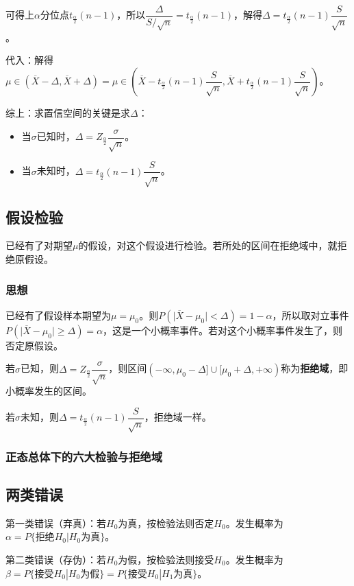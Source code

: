 \documentclass[UTF8, 12pt]{ctexart}
\begin{document}
可得上$\alpha$分位点$t_\frac{\alpha}{2}(n-1)$，所以$\dfrac{\Delta}{S/\sqrt{n}}=t_\frac{\alpha}{2}(n-1)$，解得$\Delta=t_\frac{\alpha}{2}(n-1)\dfrac{S}{\sqrt{n}}$。

代入：解得$\mu\in(\overline{X}-\Delta,\overline{X}+\Delta)=\mu\in(\overline{X}-t_\frac{\alpha}{2}(n-1)\dfrac{S}{\sqrt{n}},\overline{X}+t_\frac{\alpha}{2}(n-1)\dfrac{S}{\sqrt{n}})$。

综上：求置信空间的关键是求$\Delta$：

\begin{itemize}
    \item 当$\sigma$已知时，$\Delta=Z_\frac{\alpha}{2}\dfrac{\sigma}{\sqrt{n}}$。
    \item 当$\sigma$未知时，$\Delta=t_\frac{\alpha}{2}(n-1)\dfrac{S}{\sqrt{n}}$。
\end{itemize}

\subsection{假设检验}

已经有了对期望$\mu$的假设，对这个假设进行检验。若所处的区间在拒绝域中，就拒绝原假设。

\subsubsection{思想}

已经有了假设样本期望为$\mu=\mu_0$。则$P(\vert\overline{X}-\mu_0\vert<\Delta)=1-\alpha$，所以取对立事件$P(\vert\overline{X}-\mu_0\vert\geqslant\Delta)=\alpha$，这是一个小概率事件。若对这个小概率事件发生了，则否定原假设。

若$\sigma$已知，则$\Delta=Z_\frac{\alpha}{2}\dfrac{\sigma}{\sqrt{n}}$，则区间$(-\infty,\mu_0-\Delta]\cup[\mu_0+\Delta,+\infty)$称为\textbf{拒绝域}，即小概率发生的区间。

若$\sigma$未知，则$\Delta=t_\frac{\alpha}{2}(n-1)\dfrac{S}{\sqrt{n}}$，拒绝域一样。

\subsubsection{正态总体下的六大检验与拒绝域}

\subsection{两类错误}

第一类错误（弃真）：若$H_0$为真，按检验法则否定$H_0$。发生概率为$\alpha=P\{\text{拒绝}H_0|H_0\text{为真}\}$。

第二类错误（存伪）：若$H_0$为假，按检验法则接受$H_0$。发生概率为$\beta=P\{\text{接受}H_0|H_0\text{为假}\}=P\{\text{接受}H_0|H_1\text{为真}\}$。
\end{document}
